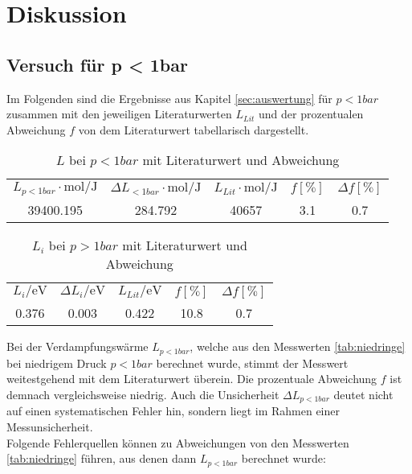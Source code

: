 \section{Diskussion}
\label{sec:Diskussion}
\subsection{Versuch für p < 1bar}
Im Folgenden sind die Ergebnisse aus Kapitel \ref{sec:auswertung} für $p<1bar$ zusammen mit den jeweiligen Literaturwerten
$L_{Lit}$ und der prozentualen Abweichung $f$ von dem Literaturwert tabellarisch dargestellt.
\begin{table}[H]
  \centering
      \caption{$L$ bei $p<1bar$ mit Literaturwert\cite{AP02} und Abweichung}
      \begin{tabular}{S S S S S}
        \toprule
        {$ L_{p<1bar} \cdot \si{\mole\per\joule}$} & {$ \Delta L_{<1bar} \cdot \si{\mole\per\joule}$} & {$ L_{Lit} \cdot \si{\mole\per\joule}$} & {$f [\%]$} & {$\Delta f [\%]$}\\
        39400.195 & 284.792 & 40657 & 3.1 & 0.7\\
        \bottomrule
      \end{tabular}
    \end{table}
\begin{table}[H]
  \centering
      \caption{$L_{i}$ bei $p>1bar$ mit Literaturwert\cite{AP03} und Abweichung}
      \begin{tabular}{S S S S S}
        \toprule
        {$ L_{i} / \si{\electronvolt}$} & {$ \Delta L_{i} / \si{\electronvolt}$} & {$ L_{Lit} / \si{\electronvolt}$} & {$f [\%]$} & {$\Delta f [\%]$}\\
        0.376 & 0.003 & 0.422 & 10.8 & 0.7\\
        \bottomrule
      \end{tabular}
    \end{table}
\noindent
Bei der Verdampfungswärme $L_{p<1bar}$, welche aus den Messwerten \ref{tab:niedringe} bei niedrigem
Druck $p<1bar$ berechnet wurde, stimmt der Messwert weitestgehend mit dem Literaturwert überein. Die
prozentuale Abweichung $f$ ist demnach vergleichsweise niedrig. Auch die Unsicherheit
$\Delta L_{p<1bar}$ deutet nicht auf einen systematischen Fehler hin, sondern liegt im Rahmen einer
Messunsicherheit.\\
Folgende Fehlerquellen können zu Abweichungen von den Messwerten \ref{tab:niedringe} führen, aus denen
dann $L_{p<1bar}$ berechnet wurde:

